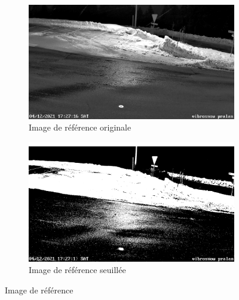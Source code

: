\begin{figure}[H]
    \begin{subfigure}{.45\textwidth}
        \includegraphics[width=\linewidth]{Images/computer_vision/snowOnRoad/ref_original.png}
        \caption{Image de référence originale}
        \label{fig:SnowOnRoad_ref_original}
    \end{subfigure}
    \hfill
    \begin{subfigure}{.45\textwidth}
        \includegraphics[width=\linewidth]{Images/computer_vision/snowOnRoad/ref_thres.png}
        \caption{Image de référence seuillée}
        \label{fig:SnowOnRoad_ref_thres}
    \end{subfigure}
    \caption[Référence pour détection de neige sur route]{Image de référence}
    \label{fig:SnowOnRoad_ref}
\end{figure}

